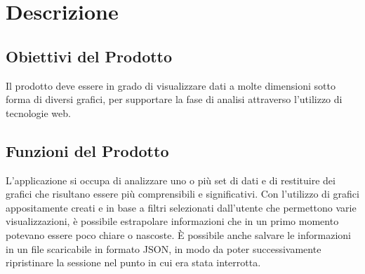 \chapter{Descrizione}

\section{Obiettivi del Prodotto}
Il prodotto deve essere in grado di visualizzare dati a molte dimensioni sotto forma di diversi grafici, per supportare la fase di analisi attraverso l'utilizzo di tecnologie web.

\section{Funzioni del Prodotto}
L'applicazione si occupa di analizzare uno o più set di dati e di restituire dei grafici che risultano essere più comprensibili e significativi.
Con l'utilizzo di grafici appositamente creati e in base a filtri selezionati dall'utente che permettono varie visualizzazioni, è possibile estrapolare informazioni che in un primo momento potevano essere poco chiare o nascoste.
È possibile anche salvare le informazioni in un file scaricabile in formato JSON, in modo da poter successivamente ripristinare la sessione nel punto in cui era stata interrotta.

